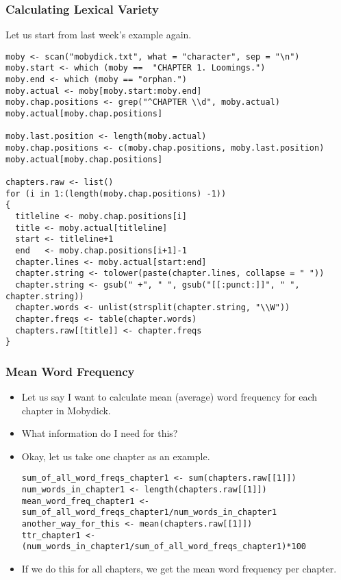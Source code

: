 \documentclass{beamer}
\begin{document}
\begin{frame}[fragile]
\frametitle{Calculating Lexical Variety}
Let us start from last week's example again. 
\tiny
\begin{verbatim}
moby <- scan("mobydick.txt", what = "character", sep = "\n")
moby.start <- which (moby ==  "CHAPTER 1. Loomings.")
moby.end <- which (moby == "orphan.")
moby.actual <- moby[moby.start:moby.end]
moby.chap.positions <- grep("^CHAPTER \\d", moby.actual)
moby.actual[moby.chap.positions]

moby.last.position <- length(moby.actual)
moby.chap.positions <- c(moby.chap.positions, moby.last.position)
moby.actual[moby.chap.positions]

chapters.raw <- list()
for (i in 1:(length(moby.chap.positions) -1))
{
  titleline <- moby.chap.positions[i]
  title <- moby.actual[titleline]
  start <- titleline+1
  end   <- moby.chap.positions[i+1]-1
  chapter.lines <- moby.actual[start:end]
  chapter.string <- tolower(paste(chapter.lines, collapse = " "))
  chapter.string <- gsub(" +", " ", gsub("[[:punct:]]", " ", chapter.string))
  chapter.words <- unlist(strsplit(chapter.string, "\\W"))
  chapter.freqs <- table(chapter.words)
  chapters.raw[[title]] <- chapter.freqs
}
\end{verbatim}
\end{frame}

\begin{frame}[fragile]
\frametitle{Mean Word Frequency}
\begin{itemize}
\item Let us say I want to calculate mean (average) word frequency for each chapter in Mobydick. 
\item What information do I need for this?  \pause
\item Okay, let us take one chapter as an example.
\tiny
\begin{verbatim}
sum_of_all_word_freqs_chapter1 <- sum(chapters.raw[[1]])
num_words_in_chapter1 <- length(chapters.raw[[1]])
mean_word_freq_chapter1 <- sum_of_all_word_freqs_chapter1/num_words_in_chapter1
another_way_for_this <- mean(chapters.raw[[1]])
ttr_chapter1 <- (num_words_in_chapter1/sum_of_all_word_freqs_chapter1)*100
\end{verbatim}
\small
\item If we do this for all chapters, we get the mean word frequency per chapter. 
\end{itemize}
\end{frame}
\end{document}
